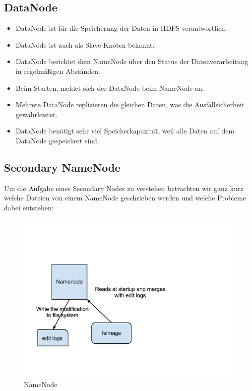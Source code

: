 \subsection{DataNode}
\begin{itemize}
\item DataNode ist für die Speicherung der Daten in HDFS verantwortlich.
\item DataNode ist auch als Slave-Knoten bekannt.
\item DataNode berichtet dem NameNode über den Status der Datenverarbeitung in regelmäßigen Abständen. 
\item Beim Starten, meldet sich der DataNode beim NameNode an.
\item Mehrere DataNode replizieren die gleichen Daten, was die Ausfallsicherheit gewährleistet.
\item DataNode benötigt sehr viel Speicherkapazität, weil alle Daten auf dem DataNode gespeichert sind.
\end{itemize}
\cite{nameNode}
\subsection{Secondary NameNode}
Um die Aufgabe eines Secondary Nodes zu verstehen betrachten wir ganz kurz welche Dateien von einem NameNode geschrieben werden und welche Probleme dabei entstehen:
\begin{figure}
	\centering
	\includegraphics[width=1.0\textwidth]{images/namenode.png}
	\caption{NameNode}
	\label{img:grafik-nameNode}
\end{figure}

